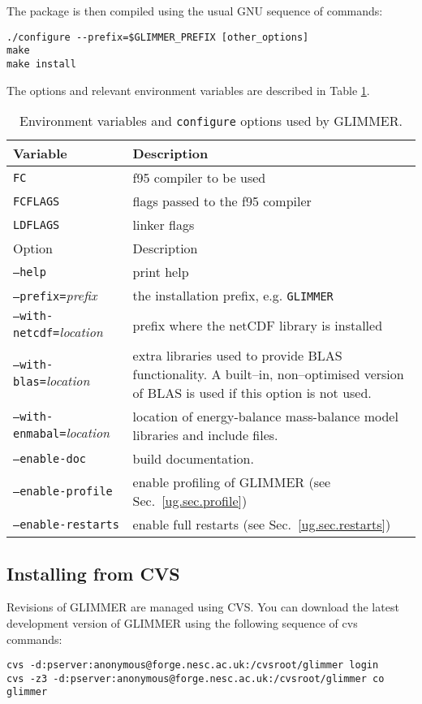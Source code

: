The package is then compiled using the usual GNU sequence of commands:
\begin{verbatim}
./configure --prefix=$GLIMMER_PREFIX [other_options]
make
make install
\end{verbatim}
%
The options and relevant environment variables are described in Table \ref{ug.tab.env}. 
%
\begin{table}[htbp]
  \centering
  \begin{tabular}{|l|p{8cm}|}
    \hline
    Variable & Description \\
    \hline
    \texttt{FC} & f95 compiler to be used \\
    \texttt{FCFLAGS} & flags passed to the f95 compiler \\
    \texttt{LDFLAGS} & linker flags\\
    \hline
    Option  & Description \\
    \hline
    \texttt{--help} & print help \\
    \texttt{--prefix=}{\it prefix} & the installation prefix, e.g. \texttt{GLIMMER} \\
    \texttt{--with-netcdf=}{\it location} & prefix where the netCDF library is installed \\
    \texttt{--with-blas=}{\it location} & extra libraries used to provide BLAS functionality. A built--in, non--optimised version of BLAS is used if this option is not used. \\
    \texttt{--with-enmabal=}{\it location} & location of energy-balance mass-balance model libraries and include files. \\
    \texttt{--enable-doc} & build documentation.\\
    \texttt{--enable-profile} & enable profiling of GLIMMER (see Sec.~\ref{ug.sec.profile})\\
    \texttt{--enable-restarts} & enable full restarts (see Sec.~\ref{ug.sec.restarts})\\
    \hline
  \end{tabular}
  \caption{Environment variables and \texttt{configure} options used by GLIMMER.}
  \label{ug.tab.env}
\end{table}
%
\subsection{Installing from CVS}
Revisions of GLIMMER are managed using CVS. You can download the latest development version of GLIMMER using the following sequence of cvs commands:
\begin{verbatim}
cvs -d:pserver:anonymous@forge.nesc.ac.uk:/cvsroot/glimmer login
cvs -z3 -d:pserver:anonymous@forge.nesc.ac.uk:/cvsroot/glimmer co glimmer
\end{verbatim}

